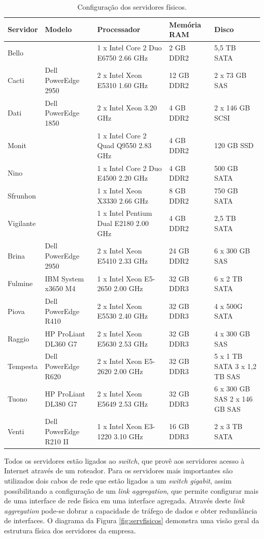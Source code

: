 \begin{table}[h!]
\caption{Configuração dos servidores físicos.}
\label{tab:servfisicos}
\begin{center}
\def\arraystretch{1}
\setlength{\tabcolsep}{0.15cm}
\begin{tabular}{|l|l|p{5.1cm}|l|p{2.1cm}|}\hline
Servidor & Modelo & Processador & Memória \ac{RAM} & Disco\\\hline
Bello & & 1 x Intel Core 2 Duo E6750 2.66 GHz & 2 GB DDR2 & 5,5 TB SATA\\\hline
Cacti & Dell PowerEdge 2950 & 2 x Intel Xeon E5310 1.60 GHz & 12 GB DDR2 & 2 x 73 GB SAS\\\hline
Dati & Dell PowerEdge 1850 & 2 x Intel Xeon 3.20 GHz & 4 GB DDR2 & 2 x 146 GB SCSI\\\hline
Monit & & 1 x Intel Core 2 Quad Q9550 2.83 GHz & 4 GB DDR2 & 120 GB SSD\\\hline
Nino & & 1 x Intel Core 2 Duo E4500 2.20 GHz & 4 GB DDR2 & 500 GB SATA\\\hline
Sfrunhon & & 1 x Intel Xeon X3330 2.66 GHz & 8 GB DDR2 & 750 GB SATA\\\hline
Vigilante & & 1 x Intel Pentium Dual E2180 2.00 GHz & 4 GB DDR2 & 2,5 TB SATA\\\hline
Brina & Dell PowerEdge 2950 & 2 x Intel Xeon E5410 2.33 GHz & 24 GB DDR2 & 6 x 300 GB SAS\\\hline
Fulmine & IBM System x3650 M4 & 1 x Intel Xeon E5-2650 2.00 GHz & 32 GB DDR3 & 6 x 2 TB SATA\\\hline
Piova & Dell PowerEdge R410 & 2 x Intel Xeon E5530 2.40 GHz & 32 GB DDR3 & 4 x 500G SATA\\\hline
Raggio & HP ProLiant DL360 G7 & 2 x  Intel Xeon E5630 2.53 GHz & 32 GB DDR3 & 4 x 300 GB SAS\\\hline
Tempesta & Dell PowerEdge R620 & 2 x Intel Xeon E5-2620 2.00 GHz & 32 GB DDR3 & 5 x 1 TB SATA 3 x 1,2 TB SAS\\\hline
Tuono & HP ProLiant DL380 G7 & 2 x Intel Xeon E5649 2.53 GHz & 32 GB DDR3 & 6 x 300 GB SAS 2 x 146 GB SAS\\\hline
Venti & Dell PowerEdge R210 II & 1 x Intel Xeon E3-1220 3.10 GHz & 16 GB DDR3 & 2 x 3 TB SATA\\\hline
\end{tabular}
\end{center}
\end{table}

Todos os servidores estão ligados ao \textit{switch}, que provê aos servidores acesso à Internet através de um roteador. Para os servidores 
mais importantes são utilizados dois cabos de rede que estão ligados a um \textit{switch} \textit{gigabit}, assim possibilitando a configuração 
de um \textit{link aggregation}, que permite configurar mais de uma interface de rede física em uma interface agregada. Através deste 
\textit{link aggregation} pode-se dobrar a capacidade de tráfego de dados e obter redundância de interfaces. 
O diagrama da Figura \ref{fig:servfisicos} demonstra uma visão geral da estrutura física dos servidores da empresa. 

